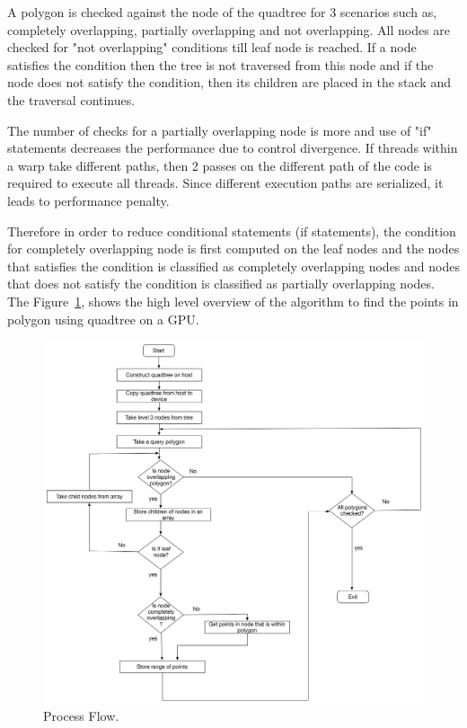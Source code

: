 A polygon is checked against the node of the quadtree for 3 scenarios such as, completely overlapping,  partially overlapping and not overlapping.
All nodes are checked for "not overlapping" conditions till leaf node is reached. If a node satisfies the condition then the tree is not traversed from this node and if the node does not satisfy the condition, then its children are placed in the stack and the traversal continues.

The number of checks for a partially overlapping node is more and use of "if" statements decreases the performance due to control divergence. If threads within a warp take different paths, then 2 passes on the different path of the code is required to execute all threads. Since different execution paths are serialized, it leads to performance penalty.

Therefore in order to reduce conditional statements (if statements), the condition for completely overlapping node is first computed on the leaf nodes and the nodes that satisfies the condition is classified as completely overlapping nodes and nodes that does not satisfy the condition is classified as partially overlapping nodes. The Figure~\ref{fig:FlowChart}, shows the high level overview of the algorithm to find the points in polygon using quadtree on a GPU. 

\begin{figure}[H]
\centering
\vspace{0.5in}
\includegraphics[scale=0.35]{Images/FlowChart}
\vspace{0.5in}
\caption{Process Flow.}
\label{fig:FlowChart}
\end{figure}

